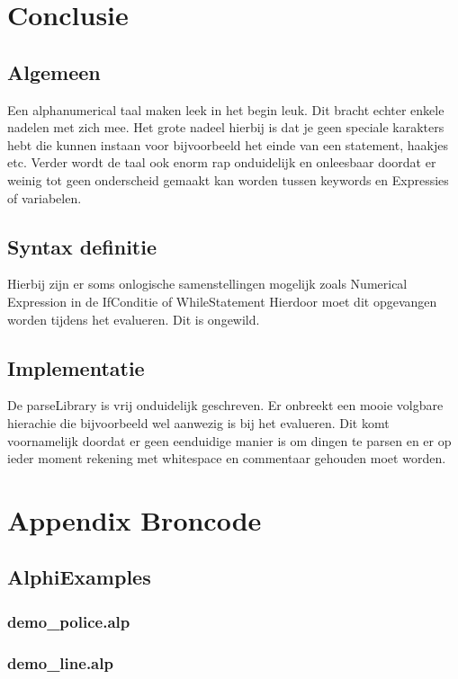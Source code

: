 \documentclass[a4paper,10pt]{article}
\begin{document}
\section{Conclusie}

\subsection{Algemeen}
Een alphanumerical taal maken leek in het begin leuk. Dit bracht echter enkele nadelen met zich mee.
Het grote nadeel hierbij is dat je geen speciale karakters hebt die kunnen instaan voor bijvoorbeeld het einde van een statement, haakjes etc.
Verder wordt de taal ook enorm rap onduidelijk en onleesbaar doordat er weinig tot geen onderscheid gemaakt kan worden tussen keywords en Expressies of variabelen.

\subsection{Syntax definitie}
Hierbij zijn er soms onlogische samenstellingen mogelijk zoals Numerical Expression in de IfConditie of WhileStatement
Hierdoor moet dit opgevangen worden tijdens het evalueren. Dit is ongewild.

\subsection{Implementatie}
De parseLibrary is vrij onduidelijk geschreven. Er onbreekt een mooie volgbare hierachie die bijvoorbeeld wel aanwezig is bij het evalueren.
Dit komt voornamelijk doordat er geen eenduidige manier is om dingen te parsen en er op ieder moment rekening met whitespace en commentaar gehouden moet worden.


\section{Appendix Broncode}

\subsection{AlphiExamples}
\subsubsection{demo\_police.alp}

\subsubsection{demo\_line.alp}

\end{document}

